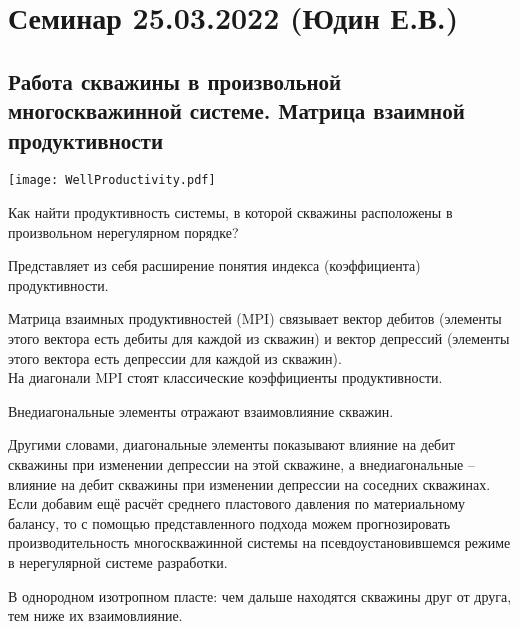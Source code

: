 \documentclass[main.tex]{subfiles}
\begin{document}
\section{Семинар 25.03.2022 (Юдин Е.В.)}

\subsection{Работа скважины в произвольной многоскважинной системе. Матрица взаимной продуктивности}

\texttt{[image: WellProductivity.pdf]}

Как найти продуктивность системы, в которой скважины расположены в произвольном нерегулярном порядке?



Представляет из себя расширение понятия индекса (коэффициента) продуктивности.

Матрица взаимных продуктивностей (MPI) связывает вектор дебитов (элементы этого вектора есть дебиты для каждой из скважин) и вектор депрессий (элементы этого вектора есть депрессии для каждой из скважин).\\

На диагонали MPI стоят классические коэффициенты продуктивности.

Внедиагональные элементы отражают взаимовлияние скважин.

Другими словами, диагональные элементы показывают влияние на дебит скважины при изменении депрессии на этой скважине, а внедиагональные -- влияние на дебит скважины при изменении депрессии на соседних скважинах.\\

Если добавим ещё расчёт среднего пластового давления по материальному балансу, то с помощью представленного подхода можем прогнозировать производительность многоскважинной системы на псевдоустановившемся режиме в нерегулярной системе разработки.

В однородном изотропном пласте: чем дальше находятся скважины друг от друга, тем ниже их взаимовлияние.

\end{document}

